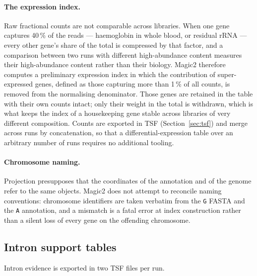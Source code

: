 \documentclass[11pt]{article}
\begin{document}
\paragraph{The expression index.}
Raw fractional counts are not comparable across libraries.
When one gene captures 40\,\% of the reads --- haemoglobin in whole
blood, or residual rRNA --- every other gene's share of the total is
compressed by that factor, and a comparison between two runs with
different high-abundance content measures their high-abundance content
rather than their biology.
Magic2 therefore computes a preliminary expression index in which the
contribution of super-expressed genes, defined as those capturing more
than 1\,\% of all counts, is removed from the normalising denominator.
Those genes are retained in the table with their own counts intact; only
their weight in the total is withdrawn, which is what keeps the index of
a housekeeping gene stable across libraries of very different
composition.
Counts are exported in TSF (Section~\ref{sec:tsf}) and merge across runs
by concatenation, so that a differential-expression table over an
arbitrary number of runs requires no additional tooling.

\paragraph{Chromosome naming.}
Projection presupposes that the coordinates of the annotation and of the
genome refer to the same objects.
Magic2 does not attempt to reconcile naming conventions: chromosome
identifiers are taken verbatim from the \texttt{G} FASTA and the
\texttt{A} annotation, and a mismatch is a fatal error at index
construction rather than a silent loss of every gene on the offending
chromosome.

\subsection{Intron support tables}
\label{sec:intron_tables}

Intron evidence is exported in two TSF files per run.
\end{document}
